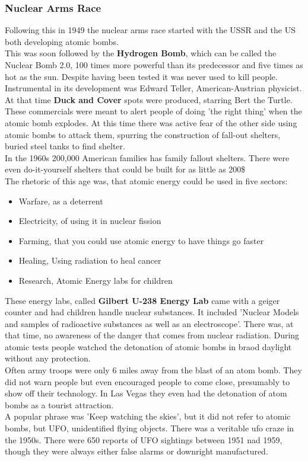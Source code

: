 \documentclass{article}
\begin{document}
	\subsubsection{Nuclear Arms Race}
	Following this in 1949 the nuclear arms race started with the USSR and the US both developing atomic bombs. \\
	This was soon followed by the \textbf{Hydrogen Bomb}, which can be called the Nuclear Bomb 2.0, 100 times more powerful than its predecessor and five times as hot as the sun. Despite having been tested it was never used to kill people. Instrumental in its development was Edward Teller, American-Austrian physicist. \\
	At that time \textbf{Duck and Cover} spots were produced, starring Bert the Turtle. These commercials were meant to alert people of doing 'the right thing' when the atomic bomb explodes. At this time there was active fear of the other side using atomic bombs to attack them, spurring the construction of fall-out shelters, buried steel tanks to find shelter. \\
	In the 1960s 200,000 American families has family fallout shelters. There were even do-it-yourself shelters that could be built for as little as 200\$ \\
	The rhetoric of this age was, that atomic energy could be used in five sectors:
	\begin{itemize}
		\item{Warfare, as a deterrent}
		\item{Electricity, of using it in nuclear fission}
		\item{Farming, that you could use atomic energy to have things go faster}
		\item{Healing, Using radiation to heal cancer}
		\item{Research, Atomic Energy labs for children}
	\end{itemize}
	These energy labs, called \textbf{Gilbert U-238 Energy Lab} came with a geiger counter and had children handle nuclear substances. It included 'Nuclear Models and samples of radioactive substances as well as an electroscope'. There was, at that time, no awareness of the danger that comes from nuclear radiation. During atomic tests people watched the detonation of atomic bombs in braod daylight without any protection. \\
	Often army troops were only 6 miles away from the blast of an atom bomb. They did not warn people but even encouraged people to come close, presumably to show off their technology. In Las Vegas they even had the detonation of atom bombs as a tourist attraction. \\
	A popular phrase was 'Keep watching the skies', but it did not refer to atomic bombs, but UFO, unidentified flying objects. There was a veritable ufo craze in the 1950s. There were 650 reports of UFO sightings between 1951 nad 1959, though they were always either false alarms or downright manufactured.
\end{document}
